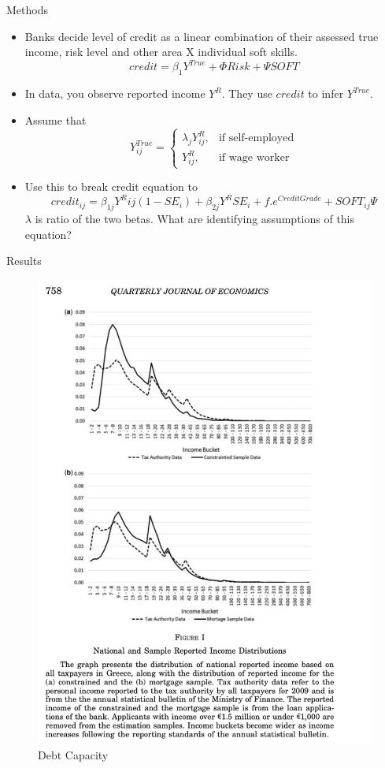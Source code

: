 \documentclass{beamer}
\begin{document}
\begin{frame}{Methods}
\begin{itemize}
    \item Banks decide level of credit as a linear combination of their assessed true income, risk level and other area X individual soft skills.
    \[credit=\beta_1 Y^{True}+\Phi Risk+\Psi
    SOFT\]
    \item In data, you observe reported income $Y^R$. They use $credit$ to infer $Y^{True}$.
    \item Assume that 
    \[Y_{ij}^{True}= \begin{cases}
			\lambda_j Y_{ij}^{R}, & \text{if self-employed}\\
            Y_{ij}^R, & \text{if wage worker}
		 \end{cases}\]
   \item Use this to break credit equation to 
   \[credit_{ij}=\beta_{1j}Y^R{ij}(1-SE_i)+\beta_{2j}Y^R SE_i+f.e^{CreditGrade}+SOFT_{ij}\Psi
   \]
   $\lambda$ is ratio of the two betas. What are identifying assumptions of this equation?
\end{itemize}
\end{frame}

\begin{frame}{Results}
    \begin{figure}
        \centering
                \caption{Debt Capacity}
\includegraphics[height=\textheight,keepaspectratio]{Paper Presentations/R1.png}
    \end{figure}
\end{frame}
\end{document}
